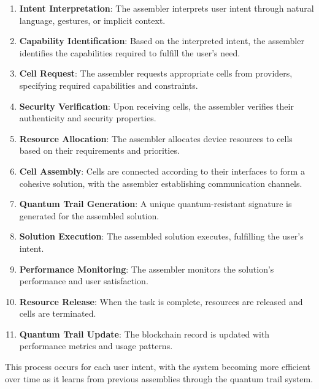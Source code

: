 \documentclass[11pt,a4paper]{article}
\begin{document}
\begin{enumerate}
    \item \textbf{Intent Interpretation}: The assembler interprets user intent through natural language, gestures, or implicit context.
    
    \item \textbf{Capability Identification}: Based on the interpreted intent, the assembler identifies the capabilities required to fulfill the user's need.
    
    \item \textbf{Cell Request}: The assembler requests appropriate cells from providers, specifying required capabilities and constraints.
    
    \item \textbf{Security Verification}: Upon receiving cells, the assembler verifies their authenticity and security properties.
    
    \item \textbf{Resource Allocation}: The assembler allocates device resources to cells based on their requirements and priorities.
    
    \item \textbf{Cell Assembly}: Cells are connected according to their interfaces to form a cohesive solution, with the assembler establishing communication channels.
    
    \item \textbf{Quantum Trail Generation}: A unique quantum-resistant signature is generated for the assembled solution.
    
    \item \textbf{Solution Execution}: The assembled solution executes, fulfilling the user's intent.
    
    \item \textbf{Performance Monitoring}: The assembler monitors the solution's performance and user satisfaction.
    
    \item \textbf{Resource Release}: When the task is complete, resources are released and cells are terminated.
    
    \item \textbf{Quantum Trail Update}: The blockchain record is updated with performance metrics and usage patterns.
\end{enumerate}

This process occurs for each user intent, with the system becoming more efficient over time as it learns from previous assemblies through the quantum trail system.
\end{document}
